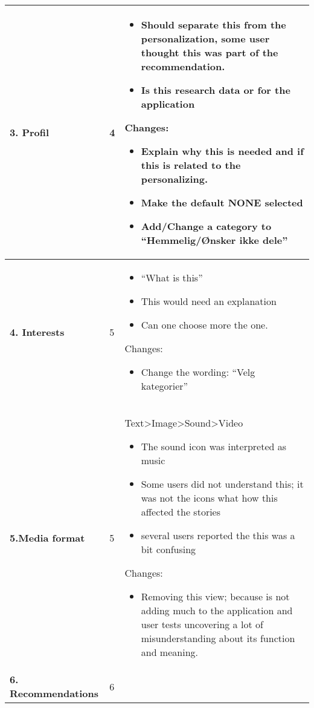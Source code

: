 \begin{center}
\begin{longtable}{ | p{4cm} | p{3cm} | p{9cm}|}
					\textbf{3. Profil} & 4 & 
					\begin{itemize}
						\item Should separate this from the personalization, some user thought this was part of the recommendation. 
						\item Is this research data or for the application
					\end{itemize}
					Changes:
					\begin{itemize}
						\item Explain why this is needed and if this is related to the personalizing.
						\item Make the default NONE selected
						\item Add/Change a category to “Hemmelig/Ønsker ikke dele”
					\end{itemize}
					\\\hline
					
					\textbf{4. Interests} & 5  & 
					\begin{itemize}		
						\item “What is this”
						\item This would need an explanation 
						\item Can one choose more the one.
					\end{itemize}			
					Changes:
					\begin{itemize}
						\item Change the wording: “Velg kategorier”
					\end{itemize}\\\hline
					\textbf{5.Media format} & 5 & 
					Text>Image>Sound>Video
					\begin{itemize}
						\item The sound icon was interpreted as music
						\item Some users did not understand this; it was not the icons what how this affected the stories
						\item several users reported the this was a bit confusing 
					\end{itemize}
					Changes:
					\begin{itemize}
						\item Removing this view; because is not adding much to the application and user tests uncovering a lot of misunderstanding about its function and meaning.
					\end{itemize}
					\\\hline
					
					\textbf{6. Recommendations} & 6 & 
					\begin{itemize}
						

\end{itemize}
\end{longtable}
\end{center}
